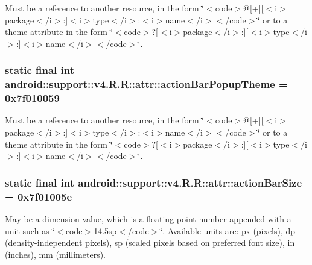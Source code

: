 Must be a reference to another resource, in the form \char`\"{}$<$code$>$@\mbox{[}+\mbox{]}\mbox{[}$<$i$>$package$<$/i$>$:\mbox{]}$<$i$>$type$<$/i$>$:$<$i$>$name$<$/i$>$$<$/code$>$\char`\"{} or to a theme attribute in the form \char`\"{}$<$code$>$?\mbox{[}$<$i$>$package$<$/i$>$:\mbox{]}\mbox{[}$<$i$>$type$<$/i$>$:\mbox{]}$<$i$>$name$<$/i$>$$<$/code$>$\char`\"{}. \hypertarget{classandroid_1_1support_1_1v4_1_1_r_1_1attr_d1a7c78acd6104a2629ba0661674d640}{
\subsubsection[{actionBarPopupTheme}]{\setlength{\rightskip}{0pt plus 5cm}static final int android::support::v4.R.R::attr::actionBarPopupTheme = 0x7f010059}}
\label{classandroid_1_1support_1_1v4_1_1_r_1_1attr_d1a7c78acd6104a2629ba0661674d640}


Must be a reference to another resource, in the form \char`\"{}$<$code$>$@\mbox{[}+\mbox{]}\mbox{[}$<$i$>$package$<$/i$>$:\mbox{]}$<$i$>$type$<$/i$>$:$<$i$>$name$<$/i$>$$<$/code$>$\char`\"{} or to a theme attribute in the form \char`\"{}$<$code$>$?\mbox{[}$<$i$>$package$<$/i$>$:\mbox{]}\mbox{[}$<$i$>$type$<$/i$>$:\mbox{]}$<$i$>$name$<$/i$>$$<$/code$>$\char`\"{}. \hypertarget{classandroid_1_1support_1_1v4_1_1_r_1_1attr_0f05b281b0b7a614e6188c5abf1ce8b9}{
\subsubsection[{actionBarSize}]{\setlength{\rightskip}{0pt plus 5cm}static final int android::support::v4.R.R::attr::actionBarSize = 0x7f01005e}}
\label{classandroid_1_1support_1_1v4_1_1_r_1_1attr_0f05b281b0b7a614e6188c5abf1ce8b9}


May be a dimension value, which is a floating point number appended with a unit such as \char`\"{}$<$code$>$14.5sp$<$/code$>$\char`\"{}. Available units are: px (pixels), dp (density-independent pixels), sp (scaled pixels based on preferred font size), in (inches), mm (millimeters). 

